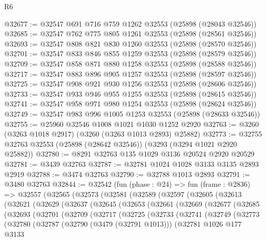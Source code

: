 \begin{lexlean}{R6}
\begin{coremodule}
@32677 := @32547 @691 @716 @759 @1262 @32553 (@25898 (@28043 @32546))
@32685 := @32547 @762 @775 @805 @1261 @32553 (@25898 (@28561 @32546))
@32693 := @32547 @808 @821 @830 @1260 @32553 (@25898 (@28570 @32546))
@32701 := @32547 @833 @846 @855 @1259 @32553 (@25898 (@28579 @32546))
@32709 := @32547 @858 @871 @880 @1258 @32553 (@25898 (@28588 @32546))
@32717 := @32547 @883 @896 @905 @1257 @32553 (@25898 (@28597 @32546))
@32725 := @32547 @908 @921 @930 @1256 @32553 (@25898 (@28606 @32546))
@32733 := @32547 @933 @946 @955 @1255 @32553 (@25898 (@28615 @32546))
@32741 := @32547 @958 @971 @980 @1254 @32553 (@25898 (@28624 @32546))
@32749 := @32547 @983 @996 @1005 @1253 @32553 (@25898 (@28633 @32546))
@32755 := @25960 @32546 @1008 @1021 @1030 @1252 @2920
@32763 := @3260 (@3263 @1018 @2917) (@3260 (@3263 @1013 @2893) @25882)
@32773 := @32755 @32763 @32553 (@25898 (@28642 @32546)) (@3293 (@3294 @1021 @2920 @25882))
@32780 := @8291 @32763 @135 @1029 @3136 @20524 @2920 @20529
@32781 := @3439 @32763
@32787 := @32781 @1024 @1028 @3133 @3135 @2893 @2919
@32788 := @3474 @32763
@32790 := @32788 @1013 @2893
@32791 := @3480 @32763
@32844 := @32542
    (fun (phase : @24) =>
    fun (frame : @2836) =>
    @32557
      (@32565
        (@32573
          (@32581
            (@32589
              (@32597
                (@32605
                  (@32613
                    (@32621
                      (@32629
                        (@32637
                          (@32645
                            (@32653
                              (@32661
                                (@32669
                                  (@32677
                                    (@32685
                                      (@32693
                                        (@32701
                                          (@32709
                                            (@32717
                                              (@32725
                                                (@32733
                                                  (@32741
                                                    (@32749
                                                      (@32773
                                                        (@32780
                                                          (@32787
                                                            (@32790 (@3479 (@32791 @1013)))
                                                            (@32781
                                                              @1026
                                                              @177
                                                              @3133

\end{coremodule}
\end{lexlean}
